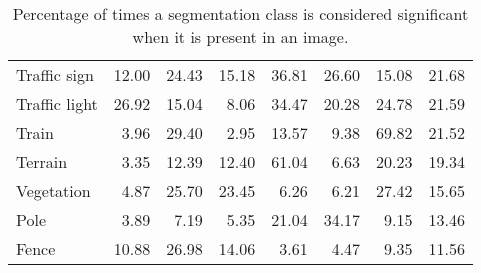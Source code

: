 \begin{table}[H]
\begin{tabular}{|l|rrrrrrr|}
		Traffic sign   & 12.00            & 24.43               & 15.18           & 36.81           & 26.60           & 15.08              & 21.68            \\
		Traffic light  & 26.92            & 15.04               & 8.06            & 34.47           & 20.28           & 24.78              & 21.59            \\
		Train          & 3.96             & 29.40               & 2.95            & 13.57           & 9.38            & 69.82              & 21.52            \\
		Terrain        & 3.35             & 12.39               & 12.40           & 61.04           & 6.63            & 20.23              & 19.34            \\
		Vegetation     & 4.87             & 25.70               & 23.45           & 6.26            & 6.21            & 27.42              & 15.65            \\
		Pole           & 3.89             & 7.19                & 5.35            & 21.04           & 34.17           & 9.15               & 13.46            \\
		Fence          & 10.88            & 26.98               & 14.06           & 3.61            & 4.47            & 9.35               & 11.56            \\
		\hline
	\end{tabular}
	\caption[Percentage of class significance when present]{
		Percentage of times a segmentation class is considered significant when it is present in an image.
	}
	\label{tab:presence_sig}
\end{table}